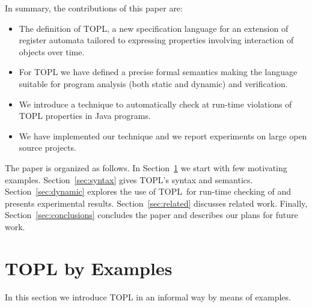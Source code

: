 \documentclass{llncs} %
\newcommand{\TPL}{TOPL}
\begin{document}
In summary, the contributions of this paper are:
\begin{itemize}
\item The definition of TOPL, a new specification language for an extension of register automata tailored to
 expressing  properties involving interaction of objects over time. 
\item For TOPL we have defined a precise formal semantics making the language suitable for program analysis (both static and dynamic) and verification. 
\item We introduce a technique to automatically check at run-time violations of TOPL properties in Java programs.
\item We have implemented our technique and we report experiments on large open source projects.
\end{itemize}

The paper is organized as follows. In Section~\ref{sec:examples} we start with few motivating examples.
Section~\ref{sec:syntax} gives  \TPL's syntax  and semantics.
Section~\ref{sec:dynamic} explores the use of \TPL \ for run-time checking of and presents experimental results. Section~\ref{sec:related} discusses related work.
Finally, Section~\ref{sec:conclusions} concludes the paper and describes our plans for future work.




\section{TOPL by Examples} \label{sec:examples} %
In this section we introduce TOPL in an informal way by means of examples.
\end{document}
